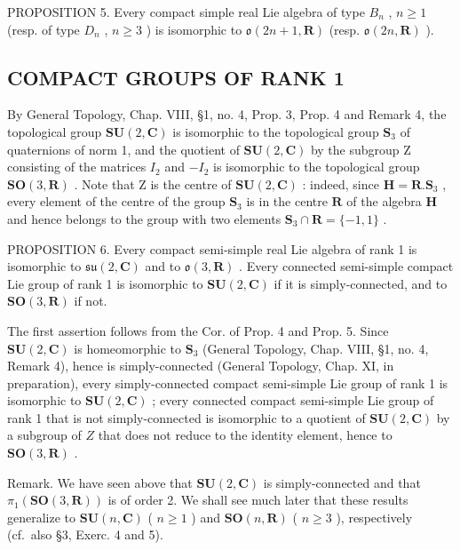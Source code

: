 PROPOSITION 5. Every compact simple real Lie algebra of type \(B_{n}\) , \(n \geq 1\) (resp. of type \(D_{n}\) , \(n \geq 3\) ) is isomorphic to \(\mathfrak{o}(2n + 1, \mathbf{R})\) (resp. \(\mathfrak{o}(2n, \mathbf{R})\) ).

\subsection{COMPACT GROUPS OF RANK 1}

By General Topology, Chap. VIII, §1, no. 4, Prop. 3, Prop. 4 and Remark 4, the topological group \(\mathbf{SU}(2,\mathbf{C})\) is isomorphic to the topological group \(\mathbf{S}_3\) of quaternions of norm 1, and the quotient of \(\mathbf{SU}(2,\mathbf{C})\) by the subgroup Z consisting of the matrices \(I_2\) and \(-I_2\) is isomorphic to the topological group \(\mathbf{SO}(3,\mathbf{R})\) . Note that Z is the centre of \(\mathbf{SU}(2,\mathbf{C})\) : indeed, since \(\mathbf{H} = \mathbf{R}.\mathbf{S}_3\) , every element of the centre of the group \(\mathbf{S}_3\) is in the centre \(\mathbf{R}\) of the algebra \(\mathbf{H}\) and hence belongs to the group with two elements \(\mathbf{S}_3 \cap \mathbf{R} = \{-1,1\}\) .

PROPOSITION 6. Every compact semi-simple real Lie algebra of rank 1 is isomorphic to \(\mathfrak{su}(2,\mathbf{C})\) and to \(\mathfrak{o}(3,\mathbf{R})\) . Every connected semi-simple compact Lie group of rank 1 is isomorphic to \(\mathbf{SU}(2,\mathbf{C})\) if it is simply-connected, and to \(\mathbf{SO}(3,\mathbf{R})\) if not.

The first assertion follows from the Cor. of Prop. 4 and Prop. 5. Since \(\mathbf{SU}(2,\mathbf{C})\) is homeomorphic to \(\mathbf{S}_3\) (General Topology, Chap. VIII, §1, no. 4, Remark 4), hence is simply-connected (General Topology, Chap. XI, in preparation), every simply-connected compact semi-simple Lie group of rank 1 is isomorphic to \(\mathbf{SU}(2,\mathbf{C})\) ; every connected compact semi-simple Lie group of rank 1 that is not simply-connected is isomorphic to a quotient of \(\mathbf{SU}(2,\mathbf{C})\) by a subgroup of \(Z\) that does not reduce to the identity element, hence to \(\mathbf{SO}(3,\mathbf{R})\) .

Remark. We have seen above that \(\mathbf{SU}(2,\mathbf{C})\) is simply-connected and that \(\pi_{1}(\mathbf{SO}(3,\mathbf{R}))\) is of order 2. We shall see much later that these results generalize to \(\mathbf{SU}(n,\mathbf{C})\) ( \(n\geq1\) ) and \(\mathbf{SO}(n,\mathbf{R})\) ( \(n\geq3\) ), respectively (cf.~also §3, Exerc. 4 and 5).

